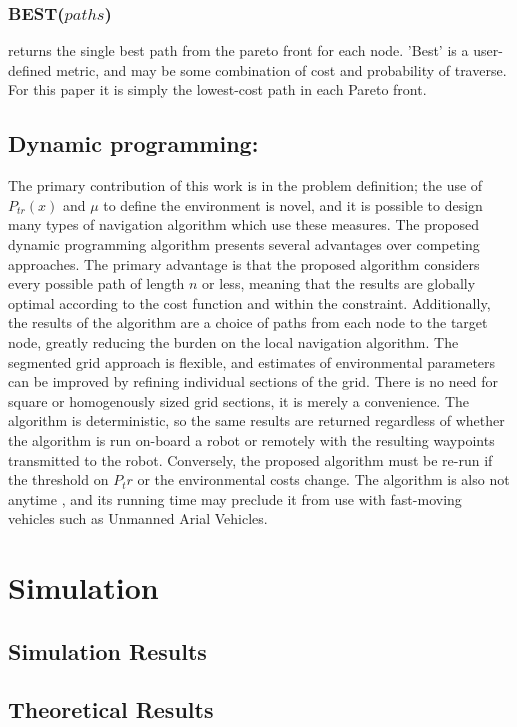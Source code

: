 \documentclass[journal]{IEEEtran}
\begin{document}
\subsubsection{BEST($paths$)} returns the single best path from the pareto front for each node. 'Best' is a user-defined metric, and may be some combination of cost and probability of traverse. For this paper it is simply the lowest-cost path in each Pareto front.

\subsection{Dynamic programming:}
The primary contribution of this work is in the problem definition; the use of $P_{tr}(x)$ and $\mu$ to define the environment is novel, and it is possible to design many types of navigation algorithm which use these measures. 
The proposed dynamic programming algorithm presents several advantages over competing approaches.
The primary advantage is that the proposed algorithm considers every possible path of length $n$ or less, meaning that the results are globally optimal according to the cost function and within the constraint. 
Additionally, the results of the algorithm are a choice of paths from each node to the target node, greatly reducing the burden on the local navigation algorithm.
The segmented grid approach is flexible, and estimates of environmental parameters can be improved by refining individual sections of the grid. There is no need for square or homogenously sized grid sections, it is merely a convenience.
The algorithm is deterministic, so the same results are returned regardless of whether the algorithm is run on-board a robot or remotely with the resulting waypoints transmitted to the robot.
Conversely, the proposed algorithm must be re-run if the threshold on $P_tr$ or the environmental costs change. 
The algorithm is also not anytime \cite{definition of anytime}, and its running time may preclude it from use with fast-moving vehicles such as Unmanned Arial Vehicles.

\section{Simulation}

\subsection{Simulation Results}
\subsection{Theoretical Results}
\end{document}
